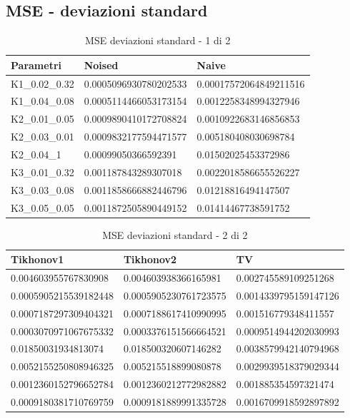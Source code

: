 \documentclass[12pt]{article}
\begin{document}
    \subsection{MSE - deviazioni standard}
    \begin{table}[!ht]
    \centering
    \begin{tabular}{|l|l|l|}
    \hline
        Parametri & Noised & Naive \\ \hline
        K1\_0.02\_0.32 & 0.0005096930780202533 & 0.00017572064849211516 \\ \hline
        K1\_0.04\_0.08 & 0.0005114466053173154 & 0.0012258348994327946 \\ \hline
        K2\_0.01\_0.05 & 0.0009890410172708824 & 0.0010922683146856853 \\ \hline
        K2\_0.03\_0.01 & 0.0009832177594471577 & 0.005180408030698784 \\ \hline
        K2\_0.04\_1 & 0.00099050366592391 & 0.01502025453372986 \\ \hline
        K3\_0.01\_0.32 & 0.001187843289307018 & 0.0022018586655526227 \\ \hline
        K3\_0.03\_0.08 & 0.0011858666882446796 & 0.01218816494147507 \\ \hline
        K3\_0.05\_0.05 & 0.0011872505890449152 & 0.01414467738591752 \\ \hline
    \end{tabular}
    \caption{MSE deviazioni standard - 1 di 2}
    \label{table:12}
    \end{table}
    
    \begin{table}[!ht]
    \centering
    \begin{tabular}{|l|l|l|}
    \hline
        Tikhonov1 & Tikhonov2 & TV \\ \hline
        0.004603955767830908 & 0.004603938366165981 & 0.002745589109251268 \\ \hline
        0.0005905215539182448 & 0.0005905230761723575 & 0.0014339795159147126 \\ \hline
        0.0007187297309404321 & 0.0007188617410990995 & 0.001516779348411557 \\ \hline
        0.0003070971067675332 & 0.0003376151566664521 & 0.0009514944202030993 \\ \hline
        0.01850031934813074 & 0.018500320607146282 & 0.0038579942140794968 \\ \hline
        0.0052155250808946325 & 0.005215518899080878 & 0.0029939518379029344 \\ \hline
        0.0012360152796652784 & 0.0012360212772982882 & 0.001885354597321474 \\ \hline
        0.0009180381710769759 & 0.0009181889991335728 & 0.0016709918592897892 \\ \hline
    \end{tabular}
    \caption{MSE deviazioni standard - 2 di 2}
    \label{table:13}
    \end{table}
    
\end{document}
